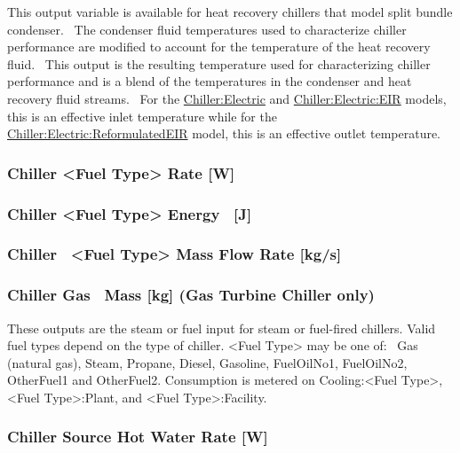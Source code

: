 This output variable is available for heat recovery chillers that model split bundle condenser.~ The condenser fluid temperatures used to characterize chiller performance are modified to account for the temperature of the heat recovery fluid.~ This output is the resulting temperature used for characterizing chiller performance and is a blend of the temperatures in the condenser and heat recovery fluid streams.~ For the \hyperref[chillerelectric]{Chiller:Electric} and \hyperref[chillerelectriceir]{Chiller:Electric:EIR} models, this is an effective inlet temperature while for the \hyperref[chillerelectricreformulatedeir]{Chiller:Electric:ReformulatedEIR} model, this is an effective outlet temperature.

\subsubsection{Chiller \textless{}Fuel Type\textgreater{} Rate {[}W{]}}\label{chiller-fuel-type-rate-w}

\subsubsection{Chiller \textless{}Fuel Type\textgreater{} Energy~ {[}J{]}}\label{chiller-fuel-type-energy-j}

\subsubsection{Chiller~ \textless{}Fuel Type\textgreater{} Mass Flow Rate {[}kg/s{]}}\label{chiller-fuel-type-mass-flow-rate-kgs}

\subsubsection{Chiller Gas~ Mass {[}kg{]} (Gas Turbine Chiller only)}\label{chiller-gas-mass-kg-gas-turbine-chiller-only}

These outputs are the steam or fuel input for steam or fuel-fired chillers. Valid fuel types depend on the type of chiller. \textless{}Fuel Type\textgreater{} may be one of:~ Gas (natural gas), Steam, Propane, Diesel, Gasoline, FuelOilNo1, FuelOilNo2, OtherFuel1 and OtherFuel2. Consumption is metered on Cooling:\textless{}Fuel Type\textgreater{}, \textless{}Fuel Type\textgreater{}:Plant, and \textless{}Fuel Type\textgreater{}:Facility.

\subsubsection{Chiller Source Hot Water Rate {[}W{]}}\label{chiller-source-hot-water-rate-w}

